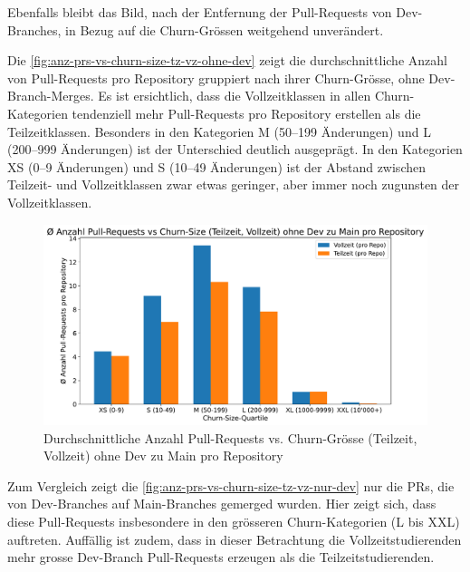 Ebenfalls bleibt das Bild, nach der Entfernung der Pull-Requests von Dev-Branches, in Bezug auf die Churn-Grössen weitgehend unverändert.

Die \autoref{fig:anz-prs-vs-churn-size-tz-vz-ohne-dev} zeigt die durchschnittliche Anzahl von Pull-Requests pro Repository gruppiert nach ihrer Churn-Grösse, ohne Dev-Branch-Merges. Es ist ersichtlich, dass die Vollzeitklassen in allen Churn-Kategorien tendenziell mehr Pull-Requests pro Repository erstellen als die Teilzeitklassen. Besonders in den Kategorien M (50–199 Änderungen) und L (200–999 Änderungen) ist der Unterschied deutlich ausgeprägt. In den Kategorien XS (0–9 Änderungen) und S (10–49 Änderungen) ist der Abstand zwischen Teilzeit- und Vollzeitklassen zwar etwas geringer, aber immer noch zugunsten der Vollzeitklassen.

\begin{figure}[htbp]
    \includegraphics[width=\textwidth]{Figures/avg-anz-prs-vs-churn-size-tz-vz-pro-repo-ohne-dev.pdf}
    \caption{Durchschnittliche Anzahl Pull-Requests vs. Churn-Grösse (Teilzeit, Vollzeit) ohne Dev zu Main pro Repository}
    \label{fig:anz-prs-vs-churn-size-tz-vz-ohne-dev}
\end{figure}


Zum Vergleich zeigt die \autoref{fig:anz-prs-vs-churn-size-tz-vz-nur-dev} nur die PRs, die von Dev-Branches auf Main-Branches gemerged wurden. Hier zeigt sich, dass diese Pull-Requests insbesondere in den grösseren Churn-Kategorien (L bis XXL) auftreten. Auffällig ist zudem, dass in dieser Betrachtung die Vollzeitstudierenden mehr grosse Dev-Branch Pull-Requests erzeugen als die Teilzeitstudierenden.

